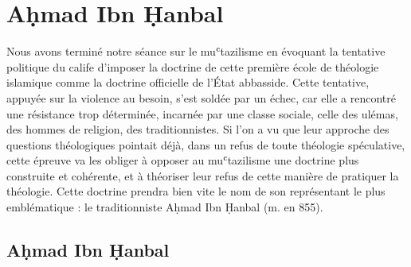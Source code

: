 
\hypertarget{suxe9ance-3}{%
\chapter{Aḥmad Ibn Ḥanbal}\label{suxe9ance-3}}



Nous avons terminé notre séance sur le muʿtazilisme en évoquant la
tentative politique du calife d'imposer la doctrine de cette première
école de théologie islamique comme la doctrine officielle de l'État
abbasside. Cette tentative, appuyée sur la violence au besoin, s'est
soldée par un échec, car elle a rencontré une résistance trop
déterminée, incarnée par une classe sociale, celle des ulémas, des
hommes de religion, des traditionnistes. Si l'on a vu que leur approche
des questions théologiques pointait déjà, dans un refus de toute
théologie spéculative, cette épreuve va les obliger à opposer au
muʿtazilisme une doctrine plus construite et cohérente, et à théoriser
leur refus de cette manière de pratiquer la théologie. Cette doctrine
prendra bien vite le nom de son représentant le plus emblématique : le
traditionniste Aḥmad Ibn Ḥanbal (m. en 855).


\hypertarget{aux1e25mad-ibn-ux1e25anbal}{%
\section{Aḥmad Ibn Ḥanbal}\label{aux1e25mad-ibn-ux1e25anbal}}



